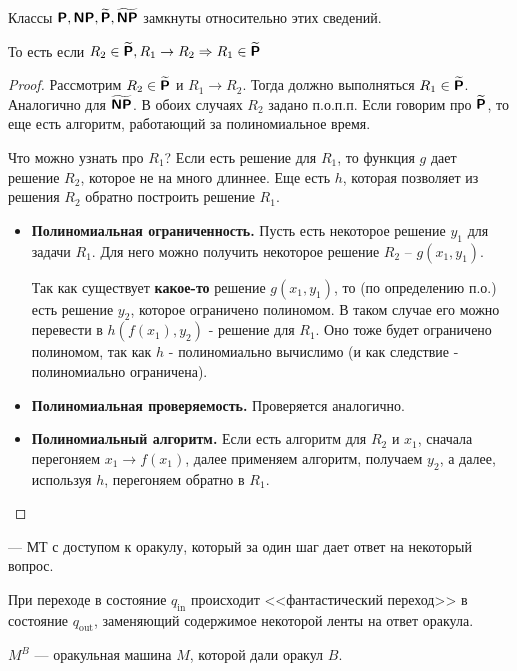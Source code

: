 \begin{thm}
	Классы $\textmd{\textbf{\textsf{P}}}, \textmd{\textbf{\textsf{NP}}}, \widetilde{\textmd{\textbf{\textsf{P}}}}, \widetilde{\textmd{\textbf{\textsf{NP}}}}$ замкнуты относительно этих сведений.
	
	То есть если $R_2 \in \widetilde{\textmd{\textbf{\textsf{P}}}}, R_1 \to R_2 \Rightarrow R_1 \in \widetilde{\textmd{\textbf{\textsf{P}}}}$
\end{thm}
\begin{proof}
	Рассмотрим $ R_2 \in \widetilde{\textmd{\textbf{\textsf{P}}}}$ и $ R_1 \to R_2$. Тогда должно выполняться $ R_1 \in \widetilde{\textmd{\textbf{\textsf{P}}}}$. Аналогично для $ \widetilde{\textmd{\textbf{\textsf{NP}}}}$. 
    В обоих случаях $ R_2$ задано п.о.п.п. Если говорим про $ \widetilde{\textmd{\textbf{\textsf{P}}}}$, то еще есть алгоритм, работающий за полиномиальное время.

	Что можно узнать про $ R_1$? Если есть решение для $ R_1$, то функция $ g$ дает решение $ R_2$, которое не на много длиннее.
	Еще есть $ h$, которая позволяет из решения $ R_2$ обратно построить решение $ R_1$.
	\begin{itemize}
		\item \textbf{Полиномиальная ограниченность.} Пусть есть некоторое решение $ y_1$ для задачи $ R_1$. Для него можно получить некоторое решение $ R_2$ -- $ g(x_1, y_1)$.

	Так как существует \textbf{какое-то} решение $ g(x_1, y_1)$, то (по определению п.о.) есть решение $ y_2$, которое ограничено полиномом. В таком случае его можно перевести в $ h(f(x_1), y_2)$ - решение для $ R_1$. Оно тоже будет ограничено полиномом, так как $ h$ - полиномиально вычислимо (и как следствие - полиномиально ограничена).

		\item \textbf{Полиномиальная проверяемость.}  Проверяется аналогично.

		\item \textbf{Полиномиальный алгоритм.} Если есть алгоритм для $ R_2$ и $ x_1$, сначала перегоняем $ x_1 \to  f(x_1)$, далее применяем алгоритм, получаем $ y_2$, а далее, используя $ h$, перегоняем обратно в $ R_1$.
	\end{itemize}
\end{proof}

\begin{defn}[Оракульная МТ]
	 --- МТ с доступом к оракулу, который за один шаг дает ответ на некоторый вопрос.
\end{defn}
\begin{name}
	При переходе в состояние $ q_{\text{in}}$ происходит <<фантастический переход>> в состояние $ q_{\text{out}}$, заменяющий содержимое некоторой ленты на ответ оракула.

	\noindent$ M^{B}$ --- оракульная машина $ M$, которой дали оракул $ B$. 
\end{name}

